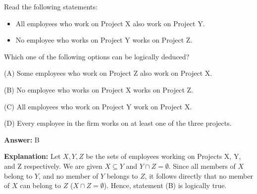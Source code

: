 \begin{tcolorbox}[enhanced,breakable,colback=boxgray,colframe=gray!45,boxrule=0.4pt,arc=2pt,left=6pt,right=6pt,top=4pt,bottom=4pt,title={Q.3},fonttitle=\bfseries\small,coltitle=black,colbacktitle=gray!15]
\small Read the following statements:\par
\begin{itemize}[leftmargin=1.4em,itemsep=1pt]
\item All employees who work on Project X also work on Project Y.
\item No employee who works on Project Y works on Project Z.
\end{itemize}
Which one of the following options can be logically deduced?\par\par\hspace*{1em}(A) Some employees who work on Project Z also work on Project X.\par\hspace*{1em}(B) No employee who works on Project X works on Project Z.\par\hspace*{1em}(C) All employees who work on Project Y work on Project X.\par\hspace*{1em}(D) Every employee in the firm works on at least one of the three projects.\par{}\par\smallskip\textbf{Answer:} B\par\par\textbf{Explanation:} Let $X, Y, Z$ be the sets of employees working on Projects X, Y, and Z respectively. We are given $X \subseteq Y$ and $Y \cap Z = \emptyset$. Since all members of $X$ belong to $Y$, and no member of $Y$ belongs to $Z$, it follows directly that no member of $X$ can belong to $Z$ ($X \cap Z = \emptyset$). Hence, statement (B) is logically true.\par
\end{tcolorbox}


